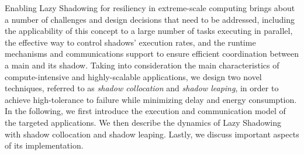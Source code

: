 Enabling Lazy Shadowing for resiliency in extreme-scale computing 
brings about a number of challenges and design decisions that need to be addressed, including the applicability of this concept to a large number of 
tasks executing in parallel, the effective way to control shadows' execution rates, and the runtime mechanisms and 
communications support to ensure efficient coordination between a 
main and its shadow.
Taking into consideration the main characteristics of compute-intensive and highly-scalable applications, we design two novel techniques, referred to as {\it shadow collocation} and {\it shadow leaping}, in order to achieve high-tolerance to failure while minimizing delay and energy consumption. In the following, we first introduce the execution and communication model of the targeted applications. We then describe the dynamics of Lazy Shadowing with shadow collocation and shadow leaping. Lastly, we discuss important aspects of its implementation. 





%



